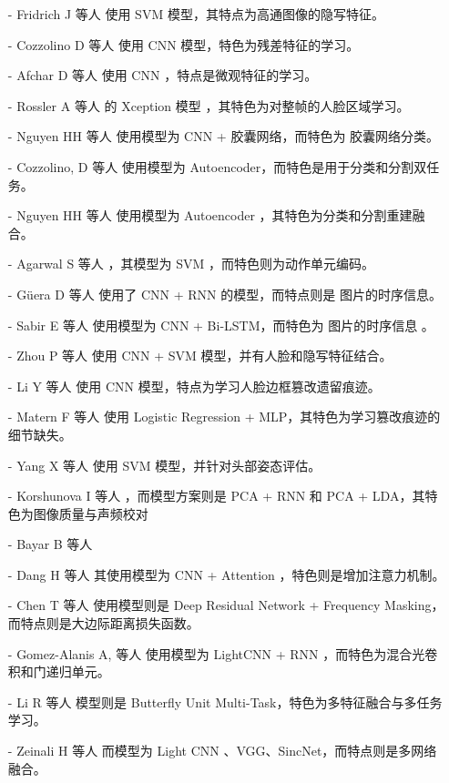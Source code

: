\begin{itemize}
\item [-] Fridrich J 等人 \cite{fridrich2012rich} 使用 SVM 模型，其特点为高通图像的隐写特征。
\item [-] Cozzolino D 等人 \cite{cozzolino2017recasting} 使用 CNN 模型，特色为残差特征的学习。
\item [-] Afchar D 等人 \cite{afchar2018mesonet} 使用 CNN ，特点是微观特征的学习。
\item [-] Rossler A 等人 \cite{rossler2019faceforensics++} 的 Xception 模型 ，其特色为对整帧的人脸区域学习。
\item [-] Nguyen HH 等人\cite{nguyen2019capsule} 使用模型为 CNN + 胶囊网络，而特色为 胶囊网络分类。
\item [-] Cozzolino, D 等人 \cite{cozzolino2018forensictransfer} 使用模型为 Autoencoder，而特色是用于分类和分割双任务。
\item [-] Nguyen HH 等人 \cite{nguyen2019multi} 使用模型为 Autoencoder ，其特色为分类和分割重建融合。
\item [-] Agarwal S 等人 \cite{agarwal2019protecting} ，其模型为 SVM ，而特色则为动作单元编码。
\item [-] Güera D 等人 \cite{guera2018deepfake} 使用了 CNN + RNN 的模型，而特点则是 图片的时序信息。
\item [-] Sabir E 等人 \cite{sabir2019recurrent} 使用模型为 CNN + Bi-LSTM，而特色为 图片的时序信息 。
\item [-] Zhou P 等人 \cite{zhou2017two} 使用 CNN + SVM 模型，并有人脸和隐写特征结合。
\item [-] Li Y 等人 \cite{li2018exposing} 使用 CNN 模型，特点为学习人脸边框篡改遗留痕迹。
\item [-] Matern F 等人 \cite{matern2019exploiting} 使用 Logistic Regression + MLP，其特色为学习篡改痕迹的细节缺失。
\item [-] Yang X 等人 \cite{yang2019exposing} 使用 SVM 模型，并针对头部姿态评估。
\item [-] Korshunova I 等人 \cite{korshunova2017fast} ，而模型方案则是 PCA + RNN 和 PCA + LDA，其特色为图像质量与声频校对
\item [-] Bayar B 等人 \cite{bayar2016deep}
\item [-] Dang H 等人 \cite{dang2020detection} 其使用模型为 CNN + Attention ，特色则是增加注意力机制。
\item [-] Chen T 等人 \cite{chen2020generalization} 使用模型则是 Deep Residual Network + Frequency Masking，而特点则是大边际距离损失函数。
\item [-] Gomez-Alanis A, 等人 \cite{gomez2019light} 使用模型为 LightCNN + RNN ，而特色为混合光卷积和门递归单元。
\item [-] Li R 等人 \cite{li2019anti} 模型则是 Butterfly Unit Multi-Task，特色为多特征融合与多任务学习。
\item [-] Zeinali H 等人 \cite{zeinali2019detecting} 而模型为 Light CNN 、VGG、SincNet，而特点则是多网络融合。
\end{itemize}












